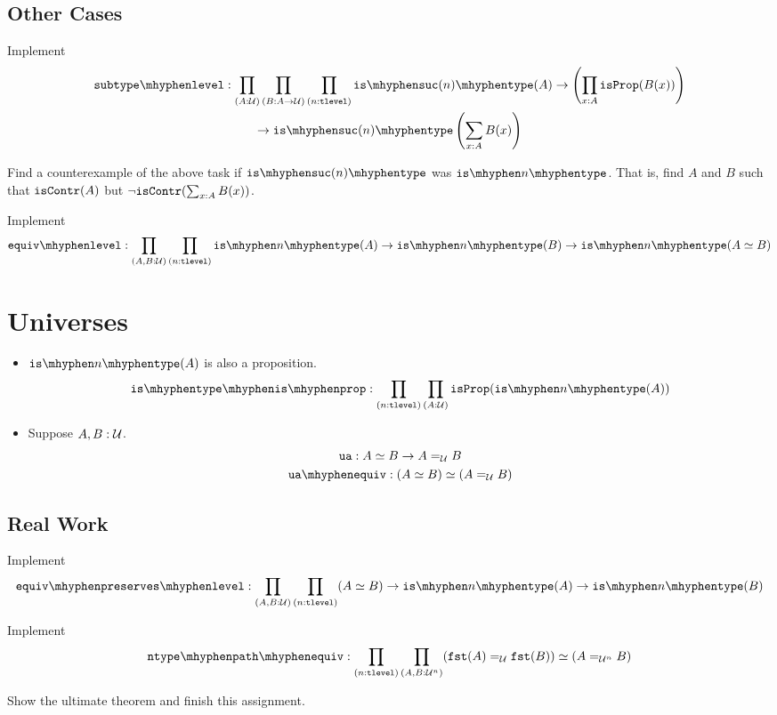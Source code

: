 \documentclass[12pt]{article}
\begin{document}
\subsection{Other Cases}

\begin{task} Implement
  \begin{multline*}
    \subtypelevel :
    \prod_{(A:\U)}
    \prod_{(B:A\to\U)}
    \prod_{(n:\tlevel)}
    \istype{\suc(n)}(A)
    \to
    \left(\prod_{x:A} \isprop(B(x))\right)
    \\
    \to
    \istype{\suc(n)}\left(\sum_{x:A}B(x)\right)
  \end{multline*}
\end{task}

\begin{bonus}
  Find a counterexample of the above task if $\istype{\suc(n)}$ was $\istype{n}$.
  That is, find $A$ and $B$ such that $\mathtt{isContr}(A)$ but $\neg \mathtt{isContr}(\sum_{x:A}B(x))$.
\end{bonus}

\begin{task} Implement
  \[
    \equivlevel :
    \prod_{(A,B:\U)}
    \prod_{(n:\tlevel)}
    \istype{n}(A) \to \istype{n}(B) \to \istype{n}(A \eqv B)
  \]
\end{task}

\section{Universes}

\begin{itemize}
  \item $\istype{n}(A)$ is also a proposition.
    \[
      \istypeisprop :
      \prod_{(n:\tlevel)}
      \prod_{(A:\U)}
      \isprop(\istype{n}(A))
    \]
  \item
    Suppose $A, B : \mathcal{U}$.
    \begin{gather*}
      \ua : A \eqv B \to A =_\U B
      \\
      \uaequiv : (A \eqv B) \eqv (A =_\U B)
    \end{gather*}
\end{itemize}

\subsection{Real Work}

\begin{task} Implement
  \[
    \equivpreserveslevel :
    \prod_{(A,B:\U)}
    \prod_{(n:\tlevel)}
    (A \eqv B) \to \istype{n}(A) \to \istype{n}(B)
  \]
\end{task}

\begin{task} Implement
  \[
    \ntypepathequiv :
    \prod_{(n:\tlevel)}
    \prod_{(A,B:\U^n)}
    (\fst(A) =_\U \fst (B))
    \eqv
    (A =_{\U^n} B)
  \]
\end{task}

\begin{task}
  Show the ultimate theorem and finish this assignment.
\end{task}
\end{document}
